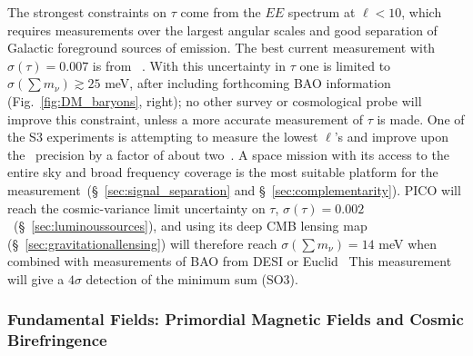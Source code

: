 \documentclass[PICOReport.tex]{subfiles}
\begin{document}
The strongest constraints on $\tau$ come from the $EE$ spectrum at $\ell < 10$, which requires measurements over the largest angular scales  and good separation of Galactic foreground sources of emission. The best current measurement with $\sigma({\tau}) = 0.007$ is from \planck~\cite{Planck2018_VI}. With this uncertainty in $\tau$ one is limited to  $\sigma(\sum m_\nu) \gtrsim 25$ meV, after including forthcoming \ac{BAO} information (Fig.~\ref{fig:DM_baryons}, right); no other survey or cosmological probe will improve this constraint, unless a more accurate measurement of $\tau$ is made. One of the S3 experiments is attempting to measure the lowest $\ell$'s and improve upon the \planck\ precision by a factor of about two~\citep{class}. A space mission with its access to the entire sky and broad frequency coverage is the most suitable platform for the measurement~(\S~\ref{sec:signal_separation} and \S~\ref{sec:complementarity}). PICO will reach the cosmic-variance limit uncertainty on $\tau$, $\sigma(\tau) = 0.002$~(\S~\ref{sec:luminoussources}), and using its deep CMB lensing map (\S~\ref{sec:gravitationallensing}) will therefore reach $\sigma(\sum m_\nu) = 14$ meV when combined with measurements of \ac{BAO} from DESI or Euclid~\cite{Levi:2013gra} 
This measurement will give a $4\sigma$ detection of the minimum sum (SO3). 



\subsubsection{Fundamental Fields: Primordial Magnetic Fields and Cosmic Birefringence}
\end{document}
